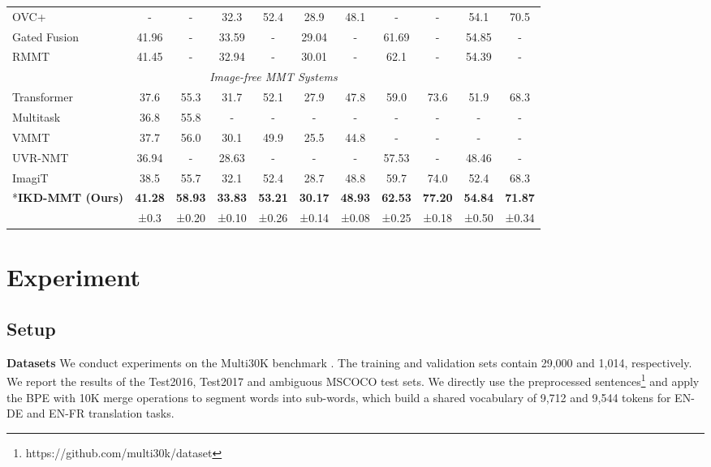 \documentclass[11pt]{article}
\begin{document}
\begin{table*}[!t]
{\begin{tabular}{l|cccccc|cccc}
OVC+\cite{wang2021efficient} & - & - & 32.3 & 52.4 & 28.9 & 48.1 & - & - & 54.1 & 70.5\\
Gated Fusion\cite{wu2021good} & 41.96 & - & 33.59 & - & 29.04 & - & 61.69 & - & 54.85 & - \\
RMMT\cite{wu2021good} & 41.45 & - & 32.94 & - & 30.01 & - & 62.1 & - & 54.39 & - \\
\hline
\multicolumn{11}{c}{\textit{Image-free MMT Systems}}\\
\hline
Transformer\cite{vaswani2017attention} & 37.6 & 55.3 & 31.7 & 52.1 & 27.9 & 47.8 & 59.0 & 73.6 & 51.9 & 68.3 \\
Multitask\cite{elliott-kadar-2017-imagination} & 36.8 & 55.8 & - & - & - & - & - & - & - & - \\
VMMT\cite{calixto-etal-2019-latent} & 37.7 & 56.0 & 30.1 & 49.9 & 25.5 & 44.8 & - & - & - & - \\
UVR-NMT\cite{Zhang2020Neural} & 36.94 & - & 28.63 & - & - & - & 57.53 & - & 48.46 & - \\
ImagiT \cite{long-etal-2021-generative} & 38.5 & 55.7 & 32.1 & 52.4 & 28.7 & 48.8 & 59.7 & 74.0 & 52.4 & 68.3 \\
\hdashline
\multirow{2}*{\textbf{IKD-MMT (Ours)}} & \textbf{41.28} & \textbf{58.93} & \textbf{33.83} & \textbf{53.21} & \textbf{30.17} & \textbf{48.93} & \textbf{62.53} & \textbf{77.20} & \textbf{54.84} & \textbf{71.87} \\
& ±0.3 & ±0.20 & ±0.10 & ±0.26 & ±0.14 & ±0.08 & ±0.25 & ±0.18 & ±0.50 & ±0.34 \\
\hline
\hline
\end{tabular}}
\end{table*}


\section{Experiment}
\subsection{Setup}
\quad \textbf{Datasets}
We conduct experiments on the Multi30K benchmark \cite{elliott-etal-2016-multi30k}.
The training and validation sets contain 29,000 and 1,014, respectively.
We report the results of the Test2016, Test2017 and ambiguous MSCOCO test sets.
We directly use the preprocessed sentences\footnote{https://github.com/multi30k/dataset} and apply the BPE \cite{sennrich2016neural} with 10K merge operations to segment words into sub-words, which build a shared vocabulary of 9,712 and 9,544 tokens for EN-DE and EN-FR translation tasks.
\end{document}

